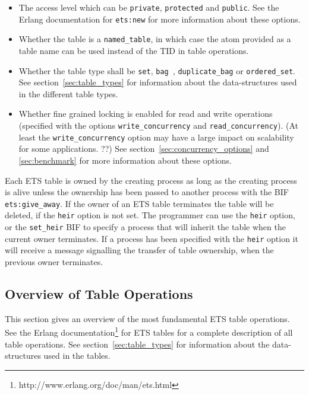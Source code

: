 \documentclass[aps,pre,preprint,nofootinbib]{revtex4}
\begin{document}
\begin{itemize}
\item 
  The access level which can be \verb|private|, \verb|protected| and \verb|public|.
  See the Erlang documentation for \verb|ets:new| for more information about these options.
\item
  Whether the table is a \verb|named_table|, in which case the atom provided as a table name can be used instead of the TID in table operations.
\item 
  Whether the table type shall be \verb|set|, \verb|bag |, \verb|duplicate_bag| or \verb|ordered_set|. 
  See section~\ref{sec:table_types} for information about the data-structures used in the different table types.
\item 
  Whether fine grained locking is enabled for read and write operations (specified with the options \verb|write_concurrency| and \verb|read_concurrency|). 
  (At least the \verb|write_concurrency| option may have a large impact on scalability for some applications. ??)
  See section~\ref{sec:concurrency_options} and \ref{sec:benchmark} for more information about these options.
\end{itemize}

Each ETS table is owned by the creating process as long as the creating process is alive unless the ownership has been passed to another process with the BIF \verb|ets:give_away|.
If the owner of an ETS table terminates the table will be deleted, if the \verb|heir| option is not set.
The programmer can use the \verb|heir| option, or the \verb|set_heir| BIF to specify a process that will inherit the table when the current owner terminates. 
If a process has been specified with the \verb|heir| option it will receive a message signalling the transfer of table ownership, when the previous owner terminates.

\subsection{Overview of Table Operations}

This section gives an overview of the most fundamental ETS table operations. 
See the Erlang documentation\footnote{http://www.erlang.org/doc/man/ets.html} for ETS tables for a complete description of all table operations. 
See section~\ref{sec:table_types} for information about the data-structures used in the tables.
\end{document}
